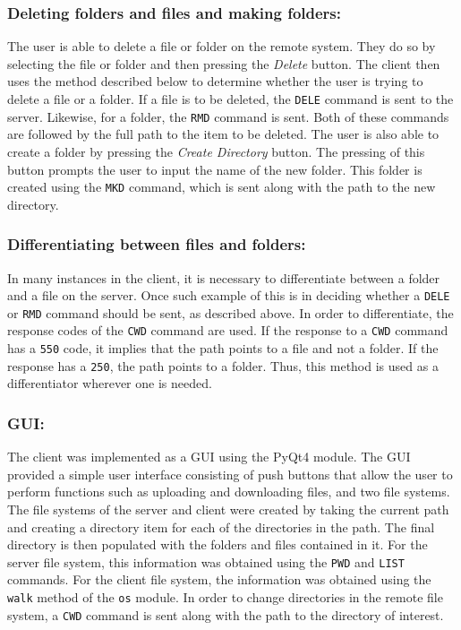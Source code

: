 \documentclass[10pt,twocolumn]{witseiepaper}
\begin{document}
\subsubsection*{Deleting folders and files and making folders:}
The user is able to delete a file or folder on the remote system. They do so by selecting the file or folder and then pressing the \textit{Delete} button. The client then uses the method described below to determine whether the user is trying to delete a file or a folder. If a file is to be deleted, the \texttt{DELE} command is sent to the server. Likewise, for a folder, the \texttt{RMD} command is sent. Both of these commands are followed by the full path to the item to be deleted. The user is also able to create a folder by pressing the \textit{Create Directory} button. The pressing of this button prompts the user to input the name of the new folder. This folder is created using the \texttt{MKD} command, which is sent along with the path to the new directory.

\subsubsection*{Differentiating between files and folders:}
In many instances in the client, it is necessary to differentiate between a folder and a file on the server. Once such example of this is in deciding whether a \texttt{DELE} or \texttt{RMD} command should be sent, as described above. In order to differentiate, the response codes of the \texttt{CWD} command are used. If the response to a \texttt{CWD} command has a \texttt{550} code, it implies that the path points to a file and not a folder. If the response has a \texttt{250}, the path points to a folder. Thus, this method is used as a differentiator wherever one is needed.

\subsubsection*{GUI:}
The client was implemented as a GUI using the PyQt4 module. The GUI provided a simple user interface consisting of push buttons that allow the user to perform functions such as uploading and downloading files, and two file systems. The file systems of the server and client were created by taking the current path and creating a directory item for each of the directories in the path. The final directory is then populated with the folders and files contained in it. For the server file system, this information was obtained using the \texttt{PWD} and \texttt{LIST} commands. For the client file system, the information was obtained using the \texttt{walk} method of the \texttt{os} module. In order to change directories in the remote file system, a \texttt{CWD} command is sent along with the path to the directory of interest.
\end{document}
